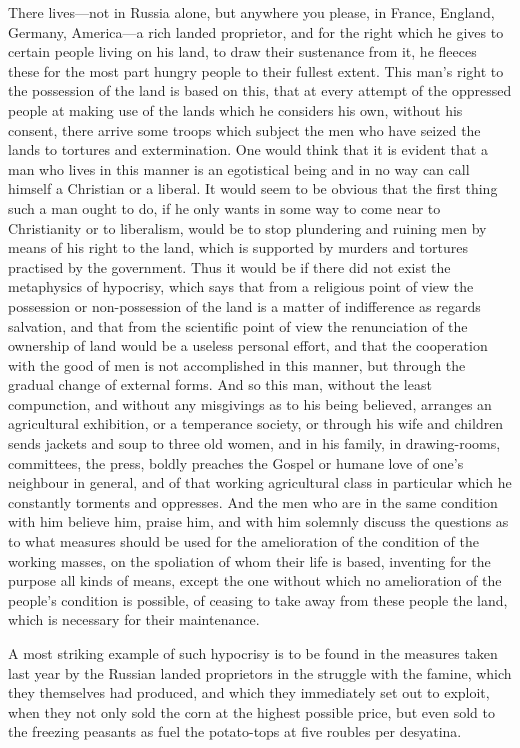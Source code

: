 \documentclass{book}
\begin{document}
There lives—not in Russia alone, but anywhere you please, in France, England, Germany, America—a rich landed proprietor, and for the right which he gives to certain people living on his land, to draw their sustenance from it, he fleeces these for the most part hungry people to their fullest extent. This man’s right to the possession of the land is based on this, that at every attempt of the oppressed people at making use of the lands which he considers his own, without his consent, there arrive some troops which subject the men who have seized the lands to tortures and extermination. One would think that it is evident that a man who lives in this manner is an egotistical being and in no way can call himself a Christian or a liberal. It would seem to be obvious that the first thing such a man ought to do, if he only wants in some way to come near to Christianity or to liberalism, would be to stop plundering and ruining men by means of his right to the land, which is supported by murders and tortures practised by the government. Thus it would be if there did not exist the metaphysics of hypocrisy, which says that from a religious point of view the possession or non-possession of the land is a matter of indifference as regards salvation, and that from the scientific point of view the renunciation of the ownership of land would be a useless personal effort, and that the cooperation with the good of men is not accomplished in this manner, but through the gradual change of external forms. And so this man, without the least compunction, and without any misgivings as to his being believed, arranges an agricultural exhibition, or a temperance society, or through his wife and children sends jackets and soup to three old women, and in his family, in drawing-rooms, committees, the press, boldly preaches the Gospel or humane love of one’s neighbour in general, and of that working agricultural class in particular which he constantly torments and oppresses. And the men who are in the same condition with him believe him, praise him, and with him solemnly discuss the questions as to what measures should be used for the amelioration of the condition of the working masses, on the spoliation of whom their life is based, inventing for the purpose all kinds of means, except the one without which no amelioration of the people’s condition is possible, of ceasing to take away from these people the land, which is necessary for their maintenance.

A most striking example of such hypocrisy is to be found in the measures taken last year by the Russian landed proprietors in the struggle with the famine, which they themselves had produced, and which they immediately set out to exploit, when they not only sold the corn at the highest possible price, but even sold to the freezing peasants as fuel the potato-tops at five roubles per desyatina.
\end{document}
